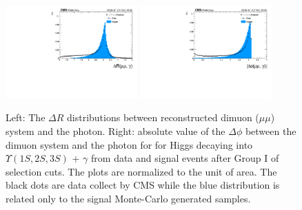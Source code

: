 \begin{figure}[!htbp]
\begin{center}
\includegraphics[width=0.45\textwidth]{figures_and_tables/outputPlots/HtoUpsilon_Cat0_ZZZZZ/au/data_x_mc/noKinCuts/h_noKin_deltaR_Upsilon_Photon}\hspace*{1.cm}
\includegraphics[width=0.45\textwidth]{figures_and_tables/outputPlots/HtoUpsilon_Cat0_ZZZZZ/au/data_x_mc/noKinCuts/h_noKin_deltaPhi_Upsilon_Photon}\end{center}\vspace*{-.5cm}
\caption{Left: The $\Delta R$ distributions between reconstructed dimuon ($\mu\mu$) system and the photon. Right: absolute value of the $\Delta \phi$ between the dimuon system and the photon for for Higgs decaying into $\Upsilon(1S,2S,3S)$ + $\gamma$ from data and signal events after Group I of selection cuts. The plots are normalized to the unit of area. The black dots are data collect by CMS while the blue distribution is related only to the signal Monte-Carlo generated samples.}
\label{fig:deltaRdeltaPhi_ZtoUpsilon_Cat0}
\end{figure}

